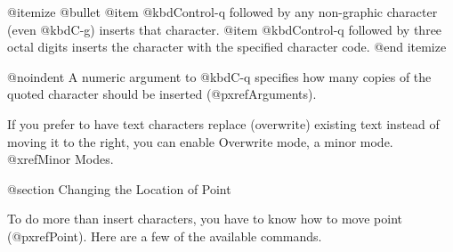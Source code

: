 {{@itemize @bullet
@item
@kbd{Control-q} followed by any non-graphic character (even @kbd{C-g})
inserts that character.
@item
@kbd{Control-q} followed by three octal digits inserts the character
with the specified character code.
@end itemize

@noindent
A numeric argument to @kbd{C-q} specifies how many copies of the quoted
character should be inserted (@pxref{Arguments}).

  If you prefer to have text characters replace (overwrite) existing
text instead of moving it to the right, you can enable Overwrite mode, a
minor mode.  @xref{Minor Modes}.

@section Changing the Location of Point

  To do more than insert characters, you have to know how to move point
(@pxref{Point}).  Here are a few of the available commands.

}}
